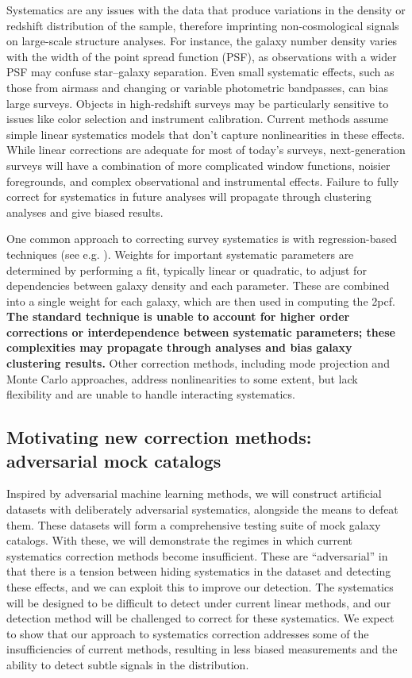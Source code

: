 \documentclass[12pt, fullpage, letterpaper]{article}
\newcommand{\cf}{2pcf\xspace}
\begin{document}
Systematics are any issues with the data that produce variations in the density or redshift distribution of the sample, therefore imprinting non-cosmological signals on large-scale structure analyses.
For instance, the galaxy number density varies with the width of the point spread function (PSF), as observations with a wider PSF may confuse star--galaxy separation.
Even small systematic effects, such as those from airmass and changing or variable photometric bandpasses, can bias large surveys. 
Objects in high-redshift surveys may be particularly sensitive to issues like color selection and instrument calibration.
Current methods assume simple linear systematics models that don't capture nonlinearities in these effects.
While linear corrections are adequate for most of today's surveys, next-generation surveys will have a combination of more complicated window functions, noisier foregrounds, and complex observational and instrumental effects.
Failure to fully correct for systematics in future analyses will propagate through clustering analyses and give biased results.

One common approach to correcting survey systematics is with regression-based techniques (see e.g. \citealt{Ross2010}).
Weights for important systematic parameters are determined by performing a fit, typically linear or quadratic, to adjust for dependencies between galaxy density and each parameter.
These are combined into a single weight for each galaxy, which are then used in computing the \cf.
\textbf{The standard technique is unable to account for higher order corrections or interdependence between systematic parameters; these complexities may propagate through analyses and bias galaxy clustering results.}
Other correction methods, including mode projection and Monte Carlo approaches, address nonlinearities to some extent, but lack flexibility and are unable to handle interacting systematics.

\subsection{Motivating new correction methods: adversarial mock catalogs}

Inspired by adversarial machine learning methods, we will construct artificial datasets with deliberately adversarial systematics, alongside the means to defeat them.
These datasets will form a comprehensive testing suite of mock galaxy catalogs.
With these, we will demonstrate the regimes in which current systematics correction methods become insufficient.
These are ``adversarial'' in that there is a tension between hiding systematics in the dataset and detecting these effects, and we can exploit this to improve our detection.
The systematics will be designed to be difficult to detect under current linear methods, and our detection method will be challenged to correct for these systematics. 
We expect to show that our approach to systematics correction addresses some of the insufficiencies of current methods, resulting in less biased measurements and the ability to detect subtle signals in the distribution.
\end{document}
